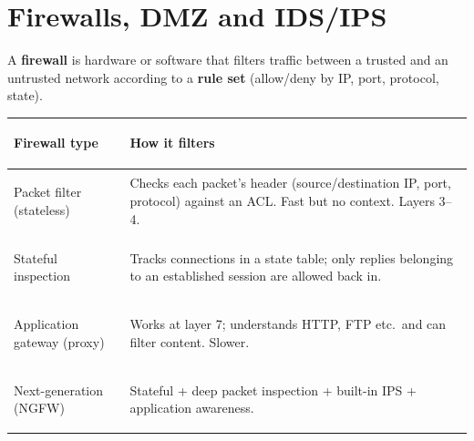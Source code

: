 \documentclass[10pt]{article}
\begin{document}
\section{Firewalls, DMZ and IDS/IPS}

A \textbf{firewall} is hardware or software that filters traffic between a trusted and an untrusted network according to a \textbf{rule set} (allow/deny by IP, port, protocol, state).

\begin{tabularx}{\linewidth}{@{}>{\bfseries\raggedright\arraybackslash}p{3.1cm}X@{}}
\toprule
Firewall type & How it filters\\\midrule
Packet filter (stateless) & Checks each packet's header (source/destination IP, port, protocol) against an ACL. Fast but no context. Layers 3--4.\\
Stateful inspection & Tracks connections in a state table; only replies belonging to an established session are allowed back in.\\
Application gateway (proxy) & Works at layer 7; understands HTTP, FTP etc.\ and can filter content. Slower.\\
Next-generation (NGFW) & Stateful + deep packet inspection + built-in IPS + application awareness.\\
\bottomrule
\end{tabularx}
\end{document}

